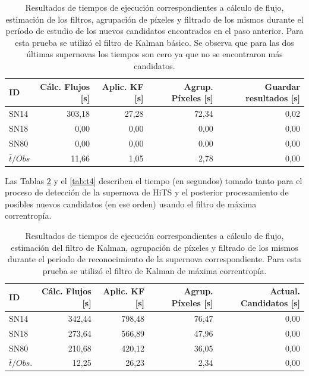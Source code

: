 \begin{table}[h!]
\centering
\caption{Resultados de tiempos de ejecuci\'on correspondientes a c\'alculo de flujo, estimaci\'on de los filtros, agrupaci\'on de p\'ixeles y filtrado de los mismos durante el per\'iodo de estudio de los nuevos candidatos encontrados en el paso anterior. Para esta prueba se utiliz\'o el filtro de Kalman b\'asico. Se observa que para las dos \'ultimas supernovas los tiempos son cero ya que no se encontraron m\'as candidatos.}
\begin{tabular}{|l|r|r|r|r|}
\hline
\textbf{ID} & \textbf{C\'alc. Flujos [s]} & \textbf{Aplic. KF [s]} &  \textbf{Agrup. P\'ixeles [s]}  & \textbf{Guardar resultados [s]}\\ \hline \hline
SN14        & 303,18            & 27,28        &  72,34 & 0,02 \\ \hline
SN18            & 0,00             & 0,00         &  0,00  & 0,00\\ \hline
SN80            & 0,00             & 0,00         &   0.00 & 0,00 \\ \hline\hline 
$\bar{t}/Obs$ & 11,66 &  1,05 & 2,78 & 0,00\\\hline 
\end{tabular}
\label{tab:t2}
\end{table}

Las Tablas \ref{tab:t3} y el \ref{tab:t4} describen el tiempo (en segundos) tomado tanto para el proceso de detecci\'on de la supernova de HiTS y el posterior procesamiento de posibles nuevos candidatos (en ese orden) usando el filtro de m\'axima correntrop\'ia.
\bigskip
 
\begin{table}[h!]
\centering
\caption{Resultados de tiempos de ejecuci\'on correspondientes a c\'alculo de flujo, estimaci\'on del filtro de Kalman, agrupaci\'on de p\'ixeles y filtrado de los mismos durante el per\'iodo de reconocimiento de la supernova correspondiente. Para esta prueba se utiliz\'o el filtro de Kalman de m\'axima correntrop\'ia.}
\begin{tabular}{|l|r|r|r|r|}
\hline
\textbf{ID} & \textbf{C\'alc. Flujos [s]} & \textbf{Aplic. KF [s]} &  \textbf{Agrup. P\'ixeles [s]}  & \textbf{Actual. Candidatos [s]}\\ \hline \hline
SN14        & 342,44            & 798,48        &  76,47 & 0,00 \\ \hline
SN18            & 273,64             & 566,89         &  47,96  & 0,00\\ \hline
SN80            & 210,68             & 420,12         &   36,05 & 0,00 \\ \hline \hline 
$\bar{t}/Obs. $& 12,25 & 26,23 & 2,34 & 0,00\\\hline 
\end{tabular}
\label{tab:t3}
\end{table}

